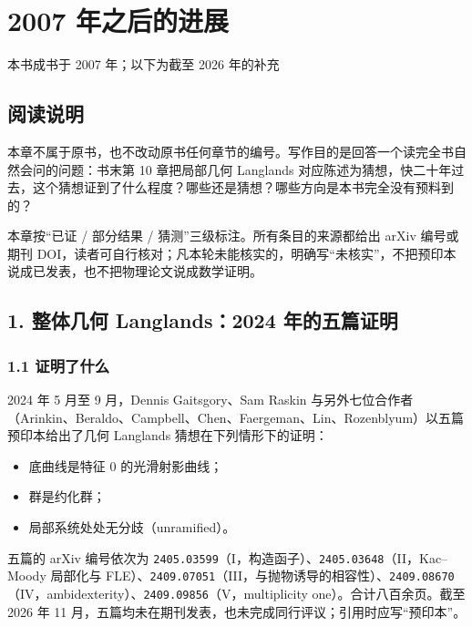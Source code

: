 \chapter*{2007 年之后的进展}

\begin{center}
\large 本书成书于 2007 年；以下为截至 2026 年的补充
\end{center}

\section*{阅读说明}

本章不属于原书，也不改动原书任何章节的编号。写作目的是回答一个读完全书自然会问的问题：书末第 10 章把局部几何 Langlands 对应陈述为猜想，快二十年过去，这个猜想证到了什么程度？哪些还是猜想？哪些方向是本书完全没有预料到的？

本章按“已证 / 部分结果 / 猜测”三级标注。所有条目的来源都给出 arXiv 编号或期刊 DOI，读者可自行核对；凡本轮未能核实的，明确写“未核实”，不把预印本说成已发表，也不把物理论文说成数学证明。

\section*{1. 整体几何 Langlands：2024 年的五篇证明}

\subsection*{1.1 证明了什么}

2024 年 5 月至 9 月，Dennis Gaitsgory、Sam Raskin 与另外七位合作者（Arinkin、Beraldo、Campbell、Chen、Faergeman、Lin、Rozenblyum）以五篇预印本给出了几何 Langlands 猜想在下列情形下的证明：
\begin{itemize}
\item 底曲线是特征 $0$ 的光滑射影曲线；
\item 群是约化群；
\item 局部系统处处无分歧（unramified）。
\end{itemize}
五篇的 arXiv 编号依次为 \texttt{2405.03599}（I，构造函子）、\texttt{2405.03648}（II，Kac--Moody 局部化与 FLE）、\texttt{2409.07051}（III，与抛物诱导的相容性）、\texttt{2409.08670}（IV，ambidexterity）、\texttt{2409.09856}（V，multiplicity one）。合计八百余页。截至 2026 年 11 月，五篇均未在期刊发表，也未完成同行评议；引用时应写“预印本”。

